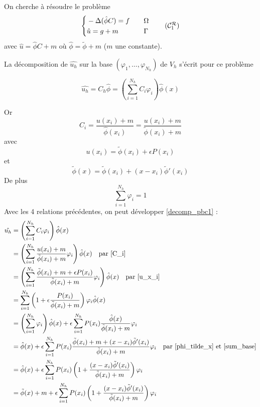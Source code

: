\documentclass[french]{article}
\begin{document}
	On cherche à résoudre le problème
	\begin{equation}
		\left\{\begin{aligned}
			&-\Delta (\hat{\phi}C)=f \quad &&\Omega \\
			&\hat{u}=g+m \quad &&\Gamma
		\end{aligned}\right. \tag{$\mathcal{C}_1^\mathcal{R}$}
	\end{equation}
	avec $\hat{u}=\hat{\phi}C+m$ où $\hat{\phi}=\tilde{\phi}+m$ ($m$ une constante).
	
	La décomposition de $\hat{u_h}$ sur la base $(\varphi_1,\dots,\varphi_{N_h})$ de $V_h$ s'écrit pour ce problème
	
	\begin{equation}
		\hat{u_h}=C_h\hat{\phi}=\left(\sum_{i=1}^{N_h}C_i\varphi_i\right)\hat{\phi}(x) \label{decomp_pbc1}
	\end{equation}

	Or 
	\begin{equation}
		C_i=\frac{u(x_i)+m}{\hat{\phi}(x_i)}=\frac{u(x_i)+m}{\tilde{\phi}(x_i)+m} \label{C_i}
	\end{equation}
	avec
	\begin{equation}
		u(x_i)=\tilde{\phi}(x_i)+\epsilon P(x_i) \label{u_x_i}
	\end{equation}
	et
	\begin{equation}
		\tilde{\phi}(x)=\tilde{\phi}(x_i)+(x-x_i)\tilde{\phi}'(x_i) \label{phi_tilde_x}
	\end{equation}
	De plus
	\begin{equation}
		\sum_{i=1}^{N_h}\varphi_i=1 \label{sum_base}
	\end{equation}
	Avec les 4 relations précédentes, on peut développer \ref{decomp_pbc1} :
	\begin{align*}
		\hat{u_h}&=\left(\sum_{i=1}^{N_h}C_i\varphi_i\right)\hat{\phi}(x) \\
		&=\left(\sum_{i=1}^{N_h}\frac{u(x_i)+m}{\tilde{\phi}(x_i)+m}\varphi_i\right)\hat{\phi}(x) \quad \text{par \ref{C_i}} \\
		&=\left(\sum_{i=1}^{N_h}\frac{\tilde{\phi}(x_i)+m+\epsilon P(x_i)}{\tilde{\phi}(x_i)+m}\varphi_i\right)\hat{\phi}(x) \quad \text{par \ref{u_x_i}} \\
		&=\sum_{i=1}^{N_h}\left(1+\epsilon\frac{ P(x_i)}{\tilde{\phi}(x_i)+m}\right)\varphi_i\hat{\phi}(x) \\
		&=\left(\sum_{i=1}^{N_h}\varphi_i\right)\hat{\phi}(x)+\epsilon\sum_{i=1}^{N_h}P(x_i)\frac{\hat{\phi}(x)}{\tilde{\phi}(x_i)+m}\varphi_i \\
		&=\hat{\phi}(x)+\epsilon\sum_{i=1}^{N_h}P(x_i)\frac{\tilde{\phi}(x_i)+m+(x-x_i)\tilde{\phi}'(x_i)}{\tilde{\phi}(x_i)+m}\varphi_i \quad \text{par \ref{phi_tilde_x} et \ref{sum_base}} \\
		&=\hat{\phi}(x)+\epsilon\sum_{i=1}^{N_h}P(x_i)\left(1+\frac{(x-x_i)\tilde{\phi}'(x_i)}{\tilde{\phi}(x_i)+m}\right)\varphi_i \\
		&=\tilde{\phi}(x)+m+\epsilon\sum_{i=1}^{N_h}P(x_i)\left(1+\frac{(x-x_i)\tilde{\phi}'(x_i)}{\tilde{\phi}(x_i)+m}\right)\varphi_i \\
	\end{align*}
\end{document}
